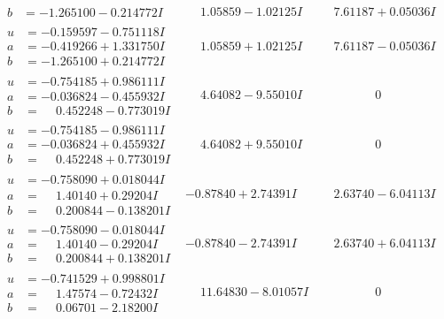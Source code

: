 \documentclass[1p]{elsarticle_modified}
\theoremstyle{definition}
\begin{document}
$$\begin{array}{c|c|c}
\begin{aligned}
b &= -1.265100 - 0.214772 I\end{aligned}
 & \phantom{-}1.05859 - 1.02125 I & \phantom{-}7.61187 + 0.05036 I \\ \hline\begin{aligned}
u &= -0.159597 - 0.751118 I \\
a &= -0.419266 + 1.331750 I \\
b &= -1.265100 + 0.214772 I\end{aligned}
 & \phantom{-}1.05859 + 1.02125 I & \phantom{-}7.61187 - 0.05036 I \\ \hline\begin{aligned}
u &= -0.754185 + 0.986111 I \\
a &= -0.036824 - 0.455932 I \\
b &= \phantom{-}0.452248 - 0.773019 I\end{aligned}
 & \phantom{-}4.64082 - 9.55010 I & \phantom{-0.000000 } 0 \\ \hline\begin{aligned}
u &= -0.754185 - 0.986111 I \\
a &= -0.036824 + 0.455932 I \\
b &= \phantom{-}0.452248 + 0.773019 I\end{aligned}
 & \phantom{-}4.64082 + 9.55010 I & \phantom{-0.000000 } 0 \\ \hline\begin{aligned}
u &= -0.758090 + 0.018044 I \\
a &= \phantom{-}1.40140 + 0.29204 I \\
b &= \phantom{-}0.200844 - 0.138201 I\end{aligned}
 & -0.87840 + 2.74391 I & \phantom{-}2.63740 - 6.04113 I \\ \hline\begin{aligned}
u &= -0.758090 - 0.018044 I \\
a &= \phantom{-}1.40140 - 0.29204 I \\
b &= \phantom{-}0.200844 + 0.138201 I\end{aligned}
 & -0.87840 - 2.74391 I & \phantom{-}2.63740 + 6.04113 I \\ \hline\begin{aligned}
u &= -0.741529 + 0.998801 I \\
a &= \phantom{-}1.47574 - 0.72432 I \\
b &= \phantom{-}0.06701 - 2.18200 I\end{aligned}
 & \phantom{-}11.64830 - 8.01057 I & \phantom{-0.000000 } 0 \\ \hline\begin{aligned}

\end{aligned}
\end{array}$$
\end{document}
